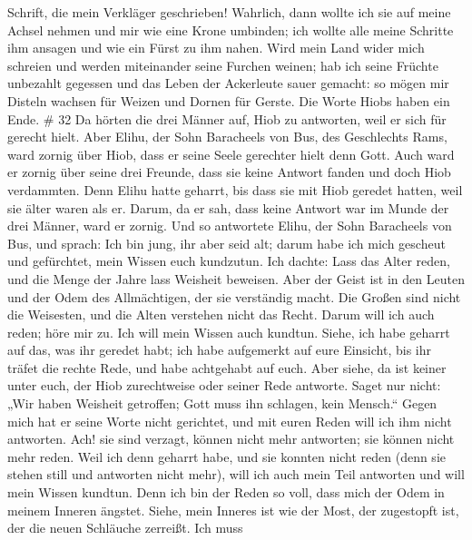 Schrift, die mein Verkläger geschrieben!  Wahrlich, dann
wollte ich sie auf meine Achsel nehmen und mir wie eine Krone umbinden;
 ich wollte alle meine Schritte ihm ansagen und wie ein
Fürst zu ihm nahen.  Wird mein Land wider mich schreien und
werden miteinander seine Furchen weinen;  hab ich seine
Früchte unbezahlt gegessen und das Leben der Ackerleute sauer gemacht:
 so mögen mir Disteln wachsen für Weizen und Dornen für
Gerste. Die Worte Hiobs haben ein Ende. \# 32  Da hörten die
drei Männer auf, Hiob zu antworten, weil er sich für gerecht hielt.
 Aber Elihu, der Sohn Baracheels von Bus, des Geschlechts
Rams, ward zornig über Hiob, dass er seine Seele gerechter hielt denn
Gott.  Auch ward er zornig über seine drei Freunde, dass sie
keine Antwort fanden und doch Hiob verdammten.  Denn Elihu
hatte geharrt, bis dass sie mit Hiob geredet hatten, weil sie älter
waren als er.  Darum, da er sah, dass keine Antwort war im
Munde der drei Männer, ward er zornig.  Und so antwortete
Elihu, der Sohn Baracheels von Bus, und sprach: Ich bin jung, ihr aber
seid alt; darum habe ich mich gescheut und gefürchtet, mein Wissen euch
kundzutun.  Ich dachte: Lass das Alter reden, und die Menge
der Jahre lass Weisheit beweisen.  Aber der Geist ist in den
Leuten und der Odem des Allmächtigen, der sie verständig macht.
 Die Großen sind nicht die Weisesten, und die Alten
verstehen nicht das Recht.  Darum will ich auch reden; höre
mir zu. Ich will mein Wissen auch kundtun.  Siehe, ich habe
geharrt auf das, was ihr geredet habt; ich habe aufgemerkt auf eure
Einsicht, bis ihr träfet die rechte Rede,  und habe
achtgehabt auf euch. Aber siehe, da ist keiner unter euch, der Hiob
zurechtweise oder seiner Rede antworte.  Saget nur nicht:
„Wir haben Weisheit getroffen; Gott muss ihn schlagen, kein Mensch.``
 Gegen mich hat er seine Worte nicht gerichtet, und mit
euren Reden will ich ihm nicht antworten.  Ach! sie sind
verzagt, können nicht mehr antworten; sie können nicht mehr reden.
 Weil ich denn geharrt habe, und sie konnten nicht reden
(denn sie stehen still und antworten nicht mehr),  will ich
auch mein Teil antworten und will mein Wissen kundtun. 
Denn ich bin der Reden so voll, dass mich der Odem in meinem Inneren
ängstet.  Siehe, mein Inneres ist wie der Most, der
zugestopft ist, der die neuen Schläuche zerreißt.  Ich muss
